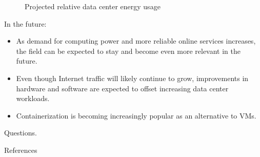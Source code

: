\documentclass[aspectratio=169]{beamer}
\begin{document}
\begin{frame}{\insertsectionhead}
    \vspace{-0.8cm}
    \begin{figure}
        \caption{Projected relative data center energy usage \cite{iea_analysis_2019}}
    \end{figure}
\end{frame}

\begin{frame}{\insertsectionhead}
    In the future:

    \begin{itemize}
        \item
            As demand for computing power and more reliable online services increases, the field can be expected to stay and become even more relevant in the future.

        \item
            Even though Internet traffic will likely continue to grow, improvements in hardware and software are expected to offset increasing data center workloads.

        \item
            Containerization is becoming increasingly popular as an alternative to VMs.
    \end{itemize}
\end{frame}

\begin{frame}[standout]
    \huge Questions.
\end{frame}


\begin{frame}[allowframebreaks]{References}
    \printbibliography
\end{frame}
\end{document}
